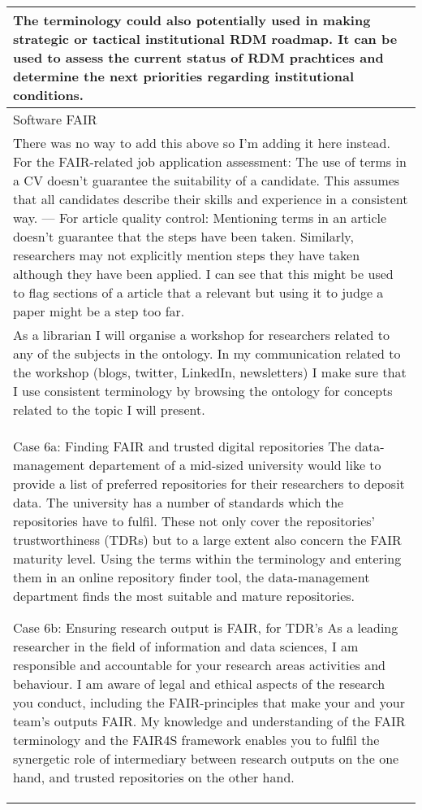 \documentclass[]{article}
\begin{document}
\begin{table}[H]
\begin{tabular}{>{\raggedright\arraybackslash\columncolor{khaki}}p{30em}}
The terminology could also potentially used in making strategic or tactical institutional RDM roadmap. It can be used to assess the current status of RDM prachtices and determine the next priorities regarding institutional conditions.\\
\hline
Software FAIR\\
\hline
There was no way to add this above so I'm adding it here instead. For the FAIR-related job application assessment: The use of terms in a CV doesn't guarantee the suitability of a candidate. This assumes that all candidates describe their skills and experience in a consistent way. --- For article quality control: Mentioning terms in an article doesn't guarantee that the steps have been taken. Similarly, researchers may not explicitly mention steps they have taken although they have been applied. I can see that this might be used to flag sections of a article that a relevant but using it to judge a paper might be a step too far.\\
\hline
As a librarian I will organise a workshop for researchers related to any of the subjects in the ontology. In my communication related to the workshop (blogs, twitter, LinkedIn, newsletters) I make sure that I use consistent terminology by browsing the ontology for concepts related to the topic I will present.\\
\hline
Case 6a: Finding FAIR and trusted digital repositories
The data-management departement of a mid-sized university would like to provide a list of preferred repositories for their researchers to deposit data. The university has a number of standards which the repositories have to fulfil. These not only cover the repositories’ trustworthiness (TDRs) but to a large extent also concern the FAIR maturity level. Using the terms within the terminology and entering them in an online repository finder tool, the data-management department finds the most suitable and mature repositories.   

Case 6b: Ensuring research output is FAIR, for TDR's 
As a leading researcher in the field of information and data sciences, I am responsible and accountable for your research areas activities and behaviour. I am aware of legal and ethical aspects of the research you conduct, including the FAIR-principles that make your and your team's outputs FAIR. My knowledge and understanding of the FAIR terminology and the FAIR4S framework enables you to fulfil the synergetic role of intermediary between research outputs on the one hand, and trusted repositories on the other hand.\\
\hline
\end{tabular}
\end{table}
\end{document}
